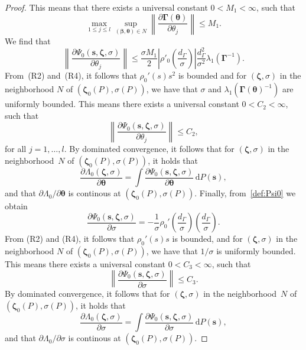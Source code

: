 \documentclass{article}
\numberwithin{equation}{section}
\theoremstyle{plain}
\newcommand{\dd}{\mathrm{d}}
\newcommand{\bbeta}{\bm\beta}
\newcommand{\btheta}{\bm\theta}
\newcommand{\bGamma}{\bm\Gamma}
\newcommand{\bzeta}{\bm\zeta}
\newcommand{\bs}{\mathbf{s}}
\begin{document}
\begin{proof}
This means that
there exists a universal constant $0<M_1<\infty$, such that
\begin{equation}
\label{eq:bound max dV}
\max_{1\leq j\leq l}
\sup_{(\bbeta,\btheta)\in N}
\left\|
\frac{\partial \bGamma(\btheta)}{\partial \theta_j}\right\|\leq M_1.
\end{equation}
We find that
\[
\left\|
\frac{\partial\Psi_0(\bs,\bzeta,\sigma)}{\partial \theta_j}
\right\|
\leq
\frac{\sigma M_1}{2}
\left|
\rho'_0\left(\frac{d_{\Gamma}}{\sigma}\right)
\right|
\frac{d_\Gamma^2}{\sigma^2}
\lambda_1(\bGamma^{-1}).
\]
From~(R2) and~(R4), it follows that $\rho_0'(s)s^2$ is bounded
and for $(\bzeta,\sigma)$ in the neighborhood $N$ of $(\bzeta_0(P),\sigma(P))$,
we have that $\sigma$ and $\lambda_1(\bGamma(\btheta)^{-1})$ are uniformly bounded.
This means there exists a universal constant $0<C_2<\infty$, such that
\[
\left\|
\frac{\partial\Psi_0(\bs,\bzeta,\sigma)}{\partial \theta_j}
\right\|
\leq C_2,
\]
for all $j=1,\ldots,l$.
By dominated convergence, it follows that
for $(\bzeta,\sigma)$ in the neighborhood~$N$ of $(\bzeta_0(P),\sigma(P))$, it holds that
\[
\frac{\partial\Lambda_0(\bzeta,\sigma)}{\partial \btheta}
=
\int
\frac{\partial\Psi_0(\bs,\bzeta,\sigma)}{\partial \btheta}\,\dd P(\bs),
\]
and that $\partial\Lambda_0/\partial\btheta$ is continous at $(\bzeta_0(P),\sigma(P))$.
Finally, from~\eqref{def:Psi0} we obtain
\[
\frac{\partial\Psi_0(\bs,\bzeta,\sigma)}{\partial \sigma}
=
-
\frac{1}{\sigma}
\rho_0'\left(\frac{d_{\Gamma}}{\sigma}\right)
\left(\frac{d_{\Gamma}}{\sigma}\right).
\]
From (R2) and (R4), it follows that $\rho_0'(s)s$ is bounded,
and for $(\bzeta,\sigma)$ in the neighborhood $N$ of $(\bzeta_0(P),\sigma(P))$,
we have that $1/\sigma$ is uniformly bounded.
This means there exists a universal constant $0<C_3<\infty$, such that
\[
\left\|
\frac{\partial\Psi_0(\bs,\bzeta,\sigma)}{\partial \sigma}
\right\|
\leq C_3.
\]
By dominated convergence, it follows that
for $(\bzeta,\sigma)$ in the neighborhood~$N$ of $(\bzeta_0(P),\sigma(P))$, it holds that
\[
\frac{\partial\Lambda_0(\bzeta,\sigma)}{\partial \sigma}
=
\int
\frac{\partial\Psi_0(\bs,\bzeta,\sigma)}{\partial \sigma}\,\dd P(\bs),
\]
and that $\partial\Lambda_0/\partial\sigma$ is continous at $(\bzeta_0(P),\sigma(P))$.
\end{proof}
\end{document}
